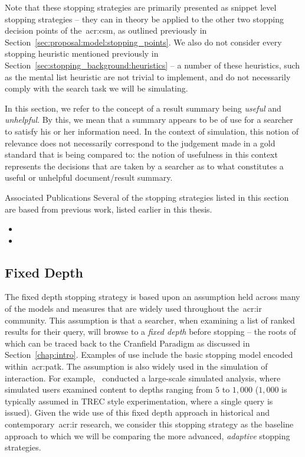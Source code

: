 Note that these stopping strategies are primarily presented as snippet level stopping strategies -- they can in theory be applied to the other two stopping decision points of the~\gls{acr:csm}, as outlined previously in Section~\ref{sec:proposal:model:stopping_points}. We also do not consider every stopping heuristic mentioned previously in Section~\ref{sec:stopping_background:heuristics} -- a number of these heuristics, such as the mental list heuristic are not trivial to implement, and do not necessarily comply with the search task we will be simulating.

\noindent{} In this section, we refer to the concept of a result summary being \emph{useful} and \emph{unhelpful}. By this, we mean that a summary appears to be of use for a searcher to satisfy his or her information need. In the context of simulation, this notion of relevance does not necessarily correspond to the judgement made in a gold standard that is being compared to: the notion of usefulness in this context represents the decisions that are taken by a searcher as to what constitutes a useful or unhelpful document/result summary.

\vspace*{5mm}
\begin{publications_box}{Associated Publications}
Several of the stopping strategies listed in this section are based from previous work, listed earlier in this thesis.
\vspace*{-3mm}
\begin{itemize}
    \item{}
    \item{}
\end{itemize}
\end{publications_box}

\subsection{Fixed Depth}
The fixed depth stopping strategy is based upon an assumption held across many of the models and measures that are widely used throughout the~\gls{acr:ir} community. This assumption is that a searcher, when examining a list of ranked results for their query, will browse to a \emph{fixed depth} before stopping -- the roots of which can be traced back to the Cranfield Paradigm as discussed in Section~\ref{chap:intro}. Examples of use include the basic stopping model encoded within~\gls{acr:patk}. The assumption is also widely used in the simulation of interaction. For example,~\cite{azzopardi2011economics} conducted a large-scale simulated analysis, where simulated users examined content to depths ranging from $5$ to $1,000$ ($1,000$ is typically assumed in TREC style experimentation, where a single query is issued). Given the wide use of this fixed depth approach in historical and contemporary~\gls{acr:ir} research, we consider this stopping strategy as the baseline approach to which we will be comparing the more advanced, \emph{adaptive} stopping strategies.

